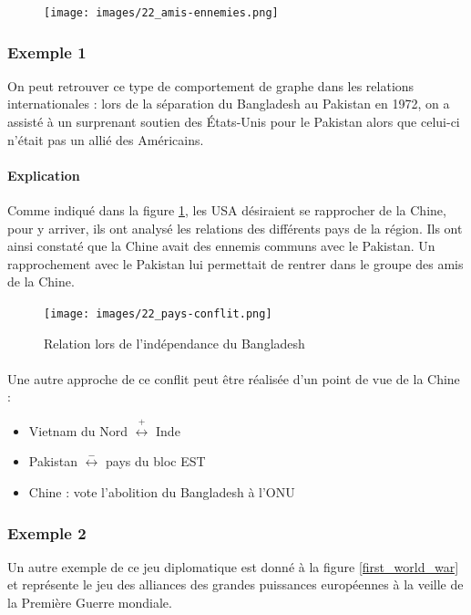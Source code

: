 \begin{figure}[!ht]
	\centering
	\texttt{[image: images/22\_amis-ennemies.png]}
\end{figure}

\subsubsection*{Exemple 1}

On peut retrouver ce type de comportement de graphe dans les relations internationales : lors de la séparation du Bangladesh au Pakistan en 1972, on a assisté à un surprenant soutien des États-Unis pour le Pakistan alors que celui-ci n'était pas un allié des Américains. 
\paragraph{Explication} 
Comme indiqué dans la figure \ref{paysconflit}, les USA désiraient se rapprocher de la Chine, pour y arriver, ils ont analysé les relations des différents pays de la région. Ils ont ainsi constaté que la Chine avait des ennemis communs avec le Pakistan. Un rapprochement avec le Pakistan lui permettait de rentrer dans le groupe des amis de la Chine.


\begin{figure}[!ht]
	\centering
	\texttt{[image: images/22\_pays-conflit.png]}
	\caption{Relation lors de l'indépendance du Bangladesh}
    \label{paysconflit}
\end{figure}

\paragraph{}
Une autre approche de ce conflit peut être réalisée d'un point de vue de la Chine : 

\begin{itemize}
	\item Vietnam du Nord $\overset{+}{\longleftrightarrow}$ Inde
	\item Pakistan $\overset{-}{\longleftrightarrow}$ pays du bloc EST
	\item Chine : vote l'abolition du Bangladesh à l'ONU
\end{itemize}

\subsubsection*{Exemple 2}
Un autre exemple de ce jeu diplomatique est donné à la figure
\ref{first_world_war} et représente le jeu des alliances des grandes puissances européennes à la veille de la Première Guerre mondiale.


